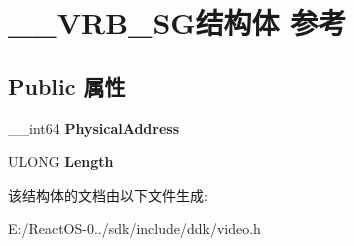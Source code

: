 \hypertarget{struct_____v_r_b___s_g}{}\section{\+\_\+\+\_\+\+V\+R\+B\+\_\+\+S\+G结构体 参考}
\label{struct_____v_r_b___s_g}
\subsection*{Public 属性}
\begin{DoxyCompactItemize}
\item 
\mbox{\label{struct_____v_r_b___s_g_a3cd1dea46597dffa936b15880291d2e9}} 
\+\_\+\+\_\+int64 {\bfseries Physical\+Address}
\item 
\mbox{\label{struct_____v_r_b___s_g_a005f59a1b632e74443ec0793ba9d4520}} 
U\+L\+O\+NG {\bfseries Length}
\end{DoxyCompactItemize}


该结构体的文档由以下文件生成\+:\begin{DoxyCompactItemize}
\item 
E\+:/\+React\+O\+S-\/0../sdk/include/ddk/video.\+h\end{DoxyCompactItemize}
